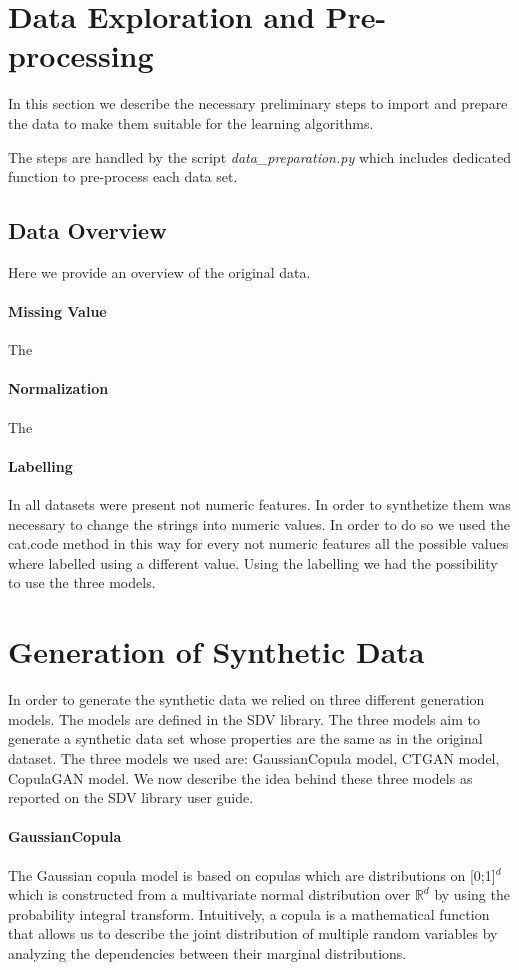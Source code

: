 \documentclass{article}
\begin{document}
\section{Data Exploration and Pre-processing}
In this section we describe the necessary preliminary steps to import and prepare the data to make them suitable for the learning algorithms.

The steps are handled by the script \textit{data\_preparation.py} which includes dedicated function to pre-process each data set.

\subsection{Data Overview}
Here we provide an overview of the original data.

\paragraph{Missing Value}
The
\paragraph{Normalization}
The
\paragraph{Labelling}
In all datasets were present not numeric features. In order to synthetize them was necessary to change the strings into numeric values. In order to do so we used the cat.code method in this way for every not numeric features all the possible values where labelled using a different value. Using the labelling we had the possibility to use the three models.

\section{Generation of Synthetic Data}
In order to generate the synthetic data we relied on three different generation models. The models are defined in the SDV library. The three models aim to generate a synthetic data set whose properties are the same as in the original dataset. The three models we used are: GaussianCopula model, CTGAN model, CopulaGAN model.
We now describe the idea behind these three models as reported on the SDV library user guide.

\paragraph{GaussianCopula}
The Gaussian copula model \cite{gaussiancopula} is based on copulas which are distributions on [0;1]$^d$ which is constructed from a multivariate normal distribution over $\mathbb{R}^d$ by using the probability integral transform. Intuitively, a copula is a mathematical function that allows us to describe the joint distribution of multiple random variables by analyzing the dependencies between their marginal distributions.
\end{document}
